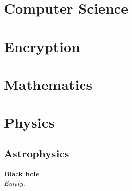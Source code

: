 \documentclass[12pt]{report}
\begin{document}
\chapter{Computer Science}



















\chapter{Encryption}









\chapter{Mathematics}






\chapter{Physics}
\section{Astrophysics}
\textbf{Black hole} \\
\textit{Empty.}
\end{document}

